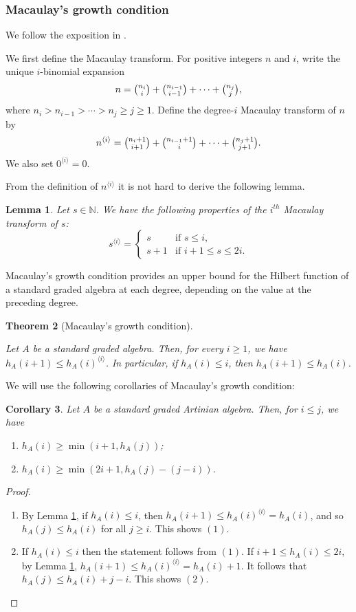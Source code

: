 \documentclass[11pt]{amsart}
\newtheorem{theorem}{Theorem}[section]
\newtheorem{lemma}[theorem]{Lemma}
\newtheorem{corollary}[theorem]{Corollary}
\theoremstyle{definition}
\newcommand{\N}{\mathbb{N}}
\newcommand{\itr}{{\langle i \rangle}}
\begin{document}
\subsubsection{Macaulay's growth condition}

We follow the exposition in
\cite[Section~2]{gunturkun2021survey}.

We first define
the Macaulay transform.
For positive integers $n$ and $i$, write the unique
$i$-binomial expansion
\[
n=\tbinom{n_i}{i}+\tbinom{n_{i-1}}{i-1}
+\cdots+\tbinom{n_j}{j},
\]
where $n_i>n_{i-1}>\cdots>n_j\geq j\geq 1$.
Define the degree-$i$ Macaulay transform of $n$ by
\[
n^{\langle i\rangle}
=
\tbinom{n_i+1}{i+1}
+\tbinom{n_{i-1}+1}{i}
+\cdots+\tbinom{n_j+1}{j+1}.
\]
We also set $0^{\langle i\rangle}=0$.

From the definition of $n^\itr$ it is not hard to derive the following lemma.
\begin{lemma}\label{lem: macualy transform}
Let $s \in \N$. We have the following properties of the $i^{th}$ Macaulay transform of $s$:
\[
s^{\langle i \rangle} = \begin{cases}
s & \text{if } s\leq i,\\
s+1 & \text{if } i+1 \leq s\leq 2i.
\end{cases}
\]
\end{lemma}

Macaulay's growth condition provides an upper bound for the Hilbert function of a standard graded algebra at each degree, depending on the value at the preceding degree.
\begin{theorem}[Macaulay's growth condition]\cite[Theorem 2.6]{gunturkun2021survey}
\label{thm:macaulay}

\noindent Let $A$ be a standard graded algebra. Then, for every
$i\geq 1$, we have $h_A(i+1)\leq h_A(i)^{\langle i\rangle}$.
In particular, if $h_A(i)\leq i$, then $h_A(i+1)\leq h_A(i)$.
\end{theorem}

We will use the following corollaries of Macaulay's growth condition:
\begin{corollary}\label{cor: growth condition cor}
Let $A$ be a standard graded Artinian algebra. Then, for $i\leq j$, we have
\begin{enumerate}
    \item $h_A(i) \geq \min(i+1, h_A(j))$;
    \item $h_A(i) \geq \min(2i+1, h_A(j) -(j-i))$.
\end{enumerate}
\end{corollary}
\begin{proof}
\noindent \begin{enumerate}
\item By Lemma \ref{lem: macualy transform}, if $h_A(i) \le i$, then $h_A(i+1) \le h_A(i)^{\langle i \rangle} = h_A(i)$, and so $h_A(j) \le h_A(i)$ for all $j \ge i$. This shows $(1)$.
\item If $h_A(i) \leq i$ then the statement follows from $(1)$. If $i+1 \leq h_A(i) \leq 2i$, by Lemma \ref{lem: macualy transform},  $h_A(i+1) \leq h_A(i)^{\itr}=h_A(i)+1$. It follows that $h_A(j) \leq h_A(i)+j-i$. This shows $(2)$.
\end{enumerate}
\end{proof}
\end{document}
